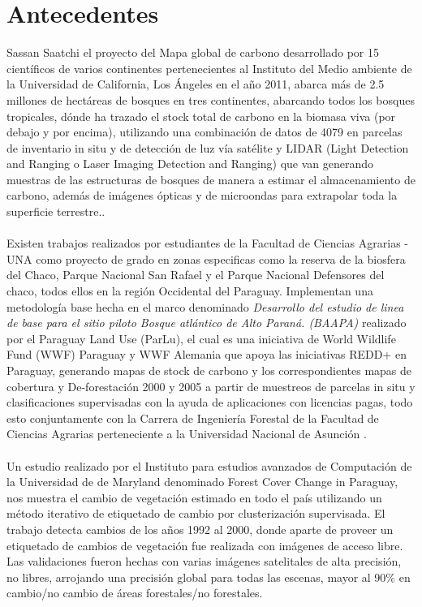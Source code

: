 \section{Antecedentes}\label{sec:antecedente}
	Sassan Saatchi\cite{saatchi2011benchmark} el proyecto del Mapa global de carbono desarrollado por 15 cient\'ificos de varios continentes pertenecientes al Instituto del Medio ambiente de la Universidad de California, Los \'Angeles en el a\~{n}o 2011, abarca m\'as de 2.5 millones de hect\'areas de bosques en tres continentes, abarcando todos los bosques tropicales, d\'onde ha trazado el stock total de carbono en la biomasa viva (por debajo y por encima), utilizando una combinaci\'on de datos de 4079 en parcelas de
	inventario in situ y de detecci\'on de luz v\'ia sat\'elite y LIDAR (Light Detection and Ranging o Laser Imaging Detection and
	Ranging) que van generando muestras de las estructuras de bosques de manera a estimar el almacenamiento de carbono,
	adem\'as de im\'agenes \'opticas y de microondas para extrapolar toda la superficie terrestre..\\~\\
	Existen trabajos realizados por estudiantes de la Facultad de Ciencias Agrarias - UNA como proyecto de grado en zonas especificas como la reserva de la biosfera del Chaco, Parque Nacional San Rafael \cite{peralta2013analisis} y el Parque Nacional Defensores del chaco\cite{almando2014estimacion}, todos ellos en la regi\'on Occidental del Paraguay. Implementan una metodolog\'ia base hecha en el marco denominado \textit{Desarrollo del estudio de linea de base para el sitio piloto Bosque atl\'antico de Alto Paran\'a. (BAAPA)}\cite{BAAPA2013} realizado por el Paraguay Land Use (ParLu), el cual es una iniciativa de World Wildlife Fund (WWF)	Paraguay y WWF Alemania que apoya las iniciativas REDD+ en Paraguay, generando mapas de stock de carbono y los correspondientes mapas de cobertura y De-forestaci\'on 2000 y 2005 a partir de muestreos de parcelas in situ y clasificaciones supervisadas con la ayuda de aplicaciones con licencias pagas, todo esto conjuntamente con la  Carrera de Ingenier\'ia Forestal de la Facultad de Ciencias Agrarias perteneciente a la Universidad Nacional de Asunci\'on .\\~\\
	Un estudio realizado por el Instituto para estudios avanzados de Computaci\'on de la Universidad de de Maryland denominado Forest Cover Change in Paraguay, nos muestra el cambio de vegetaci\'on estimado en todo el pa\'is utilizando un m\'etodo iterativo de etiquetado de cambio por clusterizaci\'on supervisada. El trabajo detecta cambios de los a\~{n}os 1992 al 2000, donde aparte de proveer un etiquetado de cambios de vegetaci\'on fue realizada con im\'agenes de acceso libre. Las validaciones fueron hechas con varias im\'agenes satelitales de alta precisi\'on, no libres, arrojando una precisi\'on global para todas las escenas, mayor al 90\% en cambio/no cambio de \'areas forestales/no forestales\cite{huang2009assessment}.

